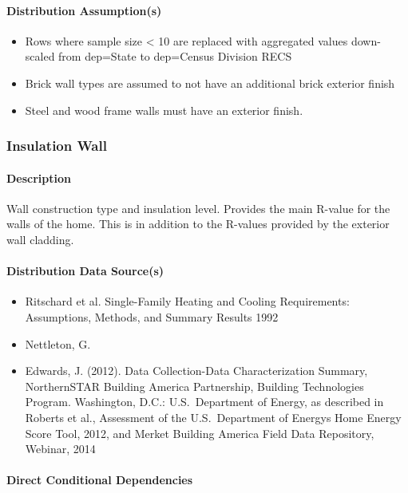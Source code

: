 \paragraph{Distribution Assumption(s)}
\begin{itemize}
\item
  Rows where sample size \textless{} 10 are replaced with aggregated
  values down-scaled from dep=\textquotesingle State\textquotesingle{}
  to dep=\textquotesingle Census Division RECS\textquotesingle{}
\item
  Brick wall types are assumed to not have an additional brick exterior
  finish
\item
  Steel and wood frame walls must have an exterior finish.
\end{itemize}

\subsubsection{Insulation Wall}\label{insulation_wall}
\paragraph{Description}
Wall construction type and insulation level. Provides the main R-value for the walls of the home. This is in addition to the R-values provided by the exterior wall cladding. 

\paragraph{Distribution Data Source(s)}
\begin{itemize}
 
\item
  Ritschard et al. Single-Family Heating and Cooling Requirements:
  Assumptions, Methods, and Summary Results 1992
\item
  Nettleton, G.
  
  \item Edwards, J. (2012). Data Collection-Data Characterization Summary,
  NorthernSTAR Building America Partnership, Building Technologies
  Program. Washington, D.C.: U.S.~Department of Energy, as described in
  Roberts et al., \textquotesingle Assessment of the U.S.~Department of
  Energy\textquotesingle s Home Energy Score Tool\textquotesingle, 2012,
  and Merket Building America Field Data Repository, Webinar, 2014
\end{itemize}
\paragraph{Direct Conditional Dependencies}
 
